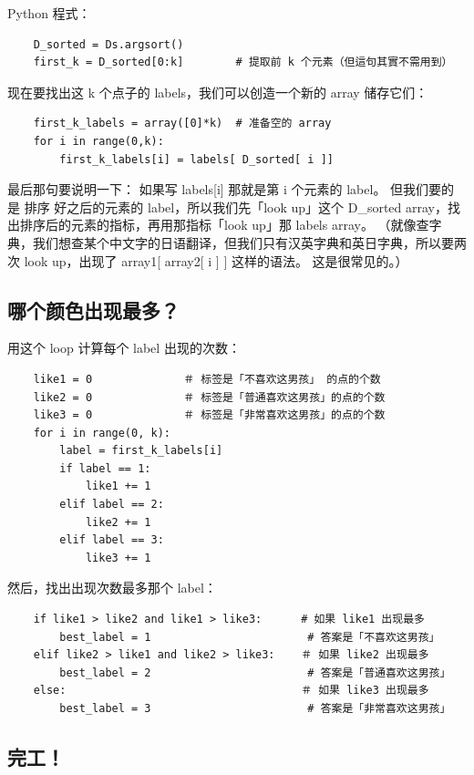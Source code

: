 \documentclass[orivec]{llncs}
\begin{document}
Python 程式：
\begin{verbatim}
    D_sorted = Ds.argsort()
    first_k = D_sorted[0:k]        # 提取前 k 个元素（但這句其實不需用到）
\end{verbatim}

现在要找出这 k 个点子的 labels，我们可以创造一个新的 array 储存它们：
\begin{verbatim}
    first_k_labels = array([0]*k)  # 准备空的 array
    for i in range(0,k):
        first_k_labels[i] = labels[ D_sorted[ i ]]
\end{verbatim}

最后那句要说明一下： 如果写 labels[i] 那就是第 i 个元素的 label。 但我们要的是 排序 好之后的元素的 label，所以我们先「look up」这个 D\_sorted array，找出排序后的元素的指标，再用那指标「look up」那 labels array。  （就像查字典，我们想查某个中文字的日语翻译，但我们只有汉英字典和英日字典，所以要两次 look up，出现了 array1[ array2[ i ] ] 这样的语法。 这是很常见的。）

\subsection{哪个颜色出现最多？}

用这个 loop 计算每个 label 出现的次数：
\begin{verbatim}
    like1 = 0              ＃ 标签是「不喜欢这男孩」 的点的个数
    like2 = 0              ＃ 标签是「普通喜欢这男孩」的点的个数
    like3 = 0              ＃ 标签是「非常喜欢这男孩」的点的个数
    for i in range(0, k):
        label = first_k_labels[i]
        if label == 1:
            like1 += 1
        elif label == 2:
            like2 += 1
        elif label == 3:
            like3 += 1
\end{verbatim}

然后，找出出现次数最多那个 label：
\begin{verbatim}
    if like1 > like2 and like1 > like3:      # 如果 like1 出现最多
        best_label = 1                        # 答案是「不喜欢这男孩」
    elif like2 > like1 and like2 > like3:    ＃ 如果 like2 出现最多
        best_label = 2                        # 答案是「普通喜欢这男孩」
    else:                                    ＃ 如果 like3 出现最多
        best_label = 3                        # 答案是「非常喜欢这男孩」
\end{verbatim}

\subsection{完工！}
\end{document}
